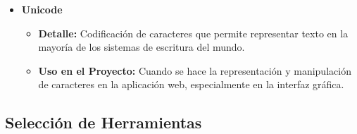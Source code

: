 \documentclass[stu, 12pt, letterpaper, donotrepeattitle, floatsintext, natbib]{apa7}
\begin{document}
\begin{itemize}
	\item \textbf{Unicode}
	\begin{itemize}
		\item \textbf{Detalle:} Codificación de caracteres que permite representar texto en la mayoría de los sistemas de escritura del mundo.
		\item \textbf{Uso en el Proyecto:} Cuando se hace la representación y manipulación de caracteres en la aplicación web, especialmente en la interfaz gráfica.
	\end{itemize}
	
\end{itemize}

\subsection{Selección de Herramientas}
\end{document}
